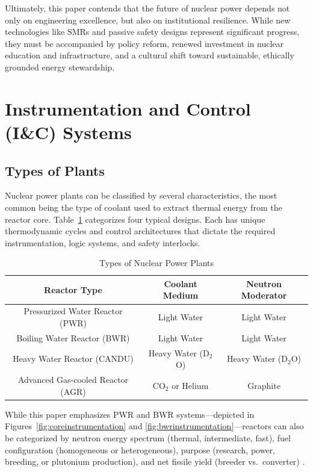 \documentclass[12pt]{article}
\begin{document}
Ultimately, this paper contends that the future of nuclear power depends not only on engineering excellence, but also on institutional resilience. While new technologies like SMRs and passive safety designs represent significant progress, they must be accompanied by policy reform, renewed investment in nuclear education and infrastructure, and a cultural shift toward sustainable, ethically grounded energy stewardship.

\section{Instrumentation and Control (I\&C) Systems}

\subsection{Types of Plants}

Nuclear power plants can be classified by several characteristics, the most common being the type of coolant used to extract thermal energy from the reactor core. Table~\ref{tab:planttypes} categorizes four typical designs. Each has unique thermodynamic cycles and control architectures that dictate the required instrumentation, logic systems, and safety interlocks.

\begin{table}[H]
  \centering
  \caption{Types of Nuclear Power Plants \cite{ichandbook}}
  \label{tab:planttypes}
  \begin{tabular}{|c|c|c|}
    \hline
    \textbf{Reactor Type} & \textbf{Coolant Medium} & \textbf{Neutron Moderator} \\
    \hline
    Pressurized Water Reactor (PWR) & Light Water & Light Water \\
    Boiling Water Reactor (BWR) & Light Water & Light Water \\
    Heavy Water Reactor (CANDU) & Heavy Water (D$_2$O) & Heavy Water (D$_2$O) \\
    Advanced Gas-cooled Reactor (AGR) & CO$_2$ or Helium & Graphite \\
    \hline
  \end{tabular}
\end{table}

While this paper emphasizes PWR and BWR systems—depicted in Figures~\ref{fig:coreinstrumentation} and \ref{fig:bwrinstrumentation}—reactors can also be categorized by neutron energy spectrum (thermal, intermediate, fast), fuel configuration (homogeneous or heterogeneous), purpose (research, power, breeding, or plutonium production), and net fissile yield (breeder vs.\ converter) \cite{ichandbook}.
\end{document}
